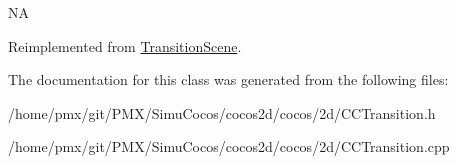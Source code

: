 NA 

Reimplemented from \hyperlink{classTransitionScene_a45e39b658189c79428a05c3bc3173bbb}{Transition\+Scene}.



The documentation for this class was generated from the following files\+:\begin{DoxyCompactItemize}
\item 
/home/pmx/git/\+P\+M\+X/\+Simu\+Cocos/cocos2d/cocos/2d/C\+C\+Transition.\+h\item 
/home/pmx/git/\+P\+M\+X/\+Simu\+Cocos/cocos2d/cocos/2d/C\+C\+Transition.\+cpp\end{DoxyCompactItemize}
